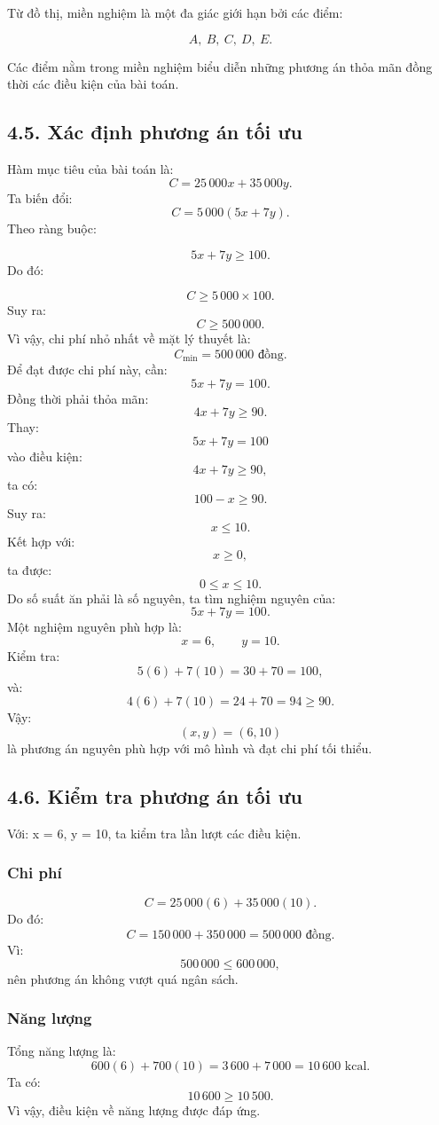 \documentclass[12pt,a4paper]{article}
\begin{document}
Từ đồ thị, miền nghiệm là một đa giác giới hạn bởi các điểm:

\[
A,\ B,\ C,\ D,\ E.
\]

Các điểm nằm trong miền nghiệm biểu diễn những phương án thỏa mãn đồng thời các điều kiện của bài toán.


\subsection*{4.5. Xác định phương án tối ưu}

Hàm mục tiêu của bài toán là:
\[
C=25\,000x+35\,000y.
\]
Ta biến đổi:
\[
C=5\,000(5x+7y).
\]
Theo ràng buộc:

\[
5x+7y\geq100.
\]
Do đó:

\[
C\geq5\,000\times100.
\]
Suy ra:
\[
C\geq500\,000.
\]
Vì vậy, chi phí nhỏ nhất về mặt lý thuyết là:
\[
\boxed{
C_{\min}=500\,000\text{ đồng}.
}
\]
Để đạt được chi phí này, cần:
\[
5x+7y=100.
\]
Đồng thời phải thỏa mãn:
\[
4x+7y\geq90.
\]
Thay:
\[
5x+7y=100
\]
vào điều kiện:
\[
4x+7y\geq90,
\]
ta có:
\[
100-x\geq90.
\]
Suy ra:
\[
x\leq10.
\]
Kết hợp với:
\[
x\geq0,
\]
ta được:
\[
0\leq x\leq10.
\]
Do số suất ăn phải là số nguyên, ta tìm nghiệm nguyên của:
\[
5x+7y=100.
\]
Một nghiệm nguyên phù hợp là:
\[
x=6,\qquad y=10.
\]
Kiểm tra:
\[
5(6)+7(10)=30+70=100,
\]
và:
\[
4(6)+7(10)=24+70=94\geq90.
\]
Vậy:
\[
\boxed{
(x,y)=(6,10)
}
\]
là phương án nguyên phù hợp với mô hình và đạt chi phí tối thiểu.


\subsection*{4.6. Kiểm tra phương án tối ưu}

Với: x = 6, y = 10, ta kiểm tra lần lượt các điều kiện.
\subsubsection*{Chi phí}
\[
C=25\,000(6)+35\,000(10).
\]
Do đó:
\[
C=150\,000+350\,000
=500\,000\text{ đồng}.
\]
Vì:
\[
500\,000\leq600\,000,
\]
nên phương án không vượt quá ngân sách.
\subsubsection*{Năng lượng}
Tổng năng lượng là:
\[
600(6)+700(10)
=3\,600+7\,000
=10\,600\text{ kcal}.
\]
Ta có:
\[
10\,600\geq10\,500.
\]
Vì vậy, điều kiện về năng lượng được đáp ứng.
\end{document}
